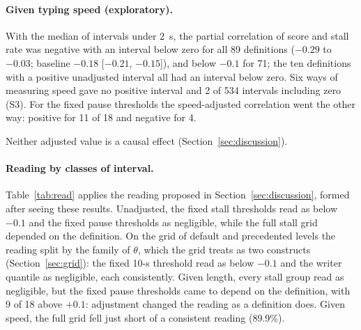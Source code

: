 \paragraph{Given typing speed (exploratory).} With the median of intervals under 2~s, the partial correlation of score and stall rate was
negative with an interval below zero for all 89 definitions ($-0.29$ to $-0.03$; baseline $-0.18$ [$-0.21$, $-0.15$]),
and below $-0.1$ for 71; the ten definitions with a positive unadjusted interval all had an interval below zero.
Six ways of measuring speed gave no positive interval and 2 of
534 intervals including zero (S3). For the fixed pause thresholds the speed-adjusted correlation went
the other way: positive for 11 of 18 and negative for 4.

Neither adjusted value is a causal effect (Section~\ref{sec:discussion}).

\paragraph{Reading by classes of interval.} Table~\ref{tab:read} applies the reading proposed in
Section~\ref{sec:discussion}, formed after seeing these results.
Unadjusted, the fixed stall thresholds read as below $-0.1$ and the fixed pause thresholds as negligible, while the full
stall grid depended on the definition. On the grid of default and precedented levels the reading split by the family of
$\theta$, which the grid treats as two constructs (Section~\ref{sec:grid}): the fixed 10-s threshold read as below
$-0.1$ and the writer quantile as negligible, each consistently. Given length, every stall group read as negligible, but
the fixed pause thresholds came to depend on the definition, with 9 of 18 above $+0.1$: adjustment changed the reading
as a definition does. Given speed, the full grid fell just short of a consistent reading (89.9\%).

